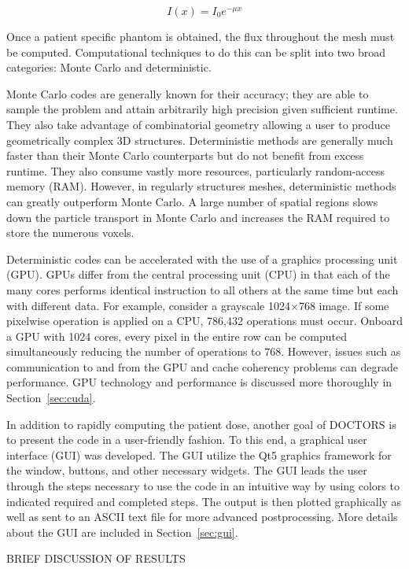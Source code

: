 \begin{equation}\label{eq:beer_lambert}
I(x) = I_0 e^{-\mu x}
\end{equation}

Once a patient specific phantom is obtained, the flux throughout the mesh must be computed. Computational techniques to do this can be split into two broad categories: Monte Carlo and deterministic.

Monte Carlo codes are generally known for their accuracy; they are able to sample the problem and attain arbitrarily high precision given sufficient runtime. They also take advantage of combinatorial geometry allowing a user to produce geometrically complex 3D structures. Deterministic methods are generally much faster than their Monte Carlo counterparts but do not benefit from excess runtime. They also consume vastly more resources, particularly random-access memory (RAM). However, in regularly structures meshes, deterministic methods can greatly outperform Monte Carlo. A large number of spatial regions slows down the particle transport in Monte Carlo and increases the RAM required to store the numerous voxels.

Deterministic codes can be accelerated with the use of a graphics processing unit (GPU). GPUs differ from the central processing unit (CPU) in that each of the many cores performs identical instruction to all others at the same time but each with different data. For example, consider a grayscale 1024$\times$768 image. If some pixelwise operation is applied on a CPU, 786,432 operations must occur. Onboard a GPU with 1024 cores, every pixel in the entire row can be computed simultaneously reducing the number of operations to 768. However, issues such as communication to and from the GPU and cache coherency problems can degrade performance. GPU technology and performance is discussed more thoroughly in Section~\ref{sec:cuda}.

In addition to rapidly computing the patient dose, another goal of DOCTORS is to present the code in a user-friendly fashion. To this end, a graphical user interface (GUI) was developed. The GUI utilize the Qt5 graphics framework for the window, buttons, and other necessary widgets. The GUI leads the user through the steps necessary to use the code in an intuitive way by using colors to indicated required and completed steps. The output is then plotted graphically as well as sent to an ASCII text file for more advanced postprocessing. More details about the GUI are included in Section~\ref{sec:gui}.

BRIEF DISCUSSION OF RESULTS

\endinput
